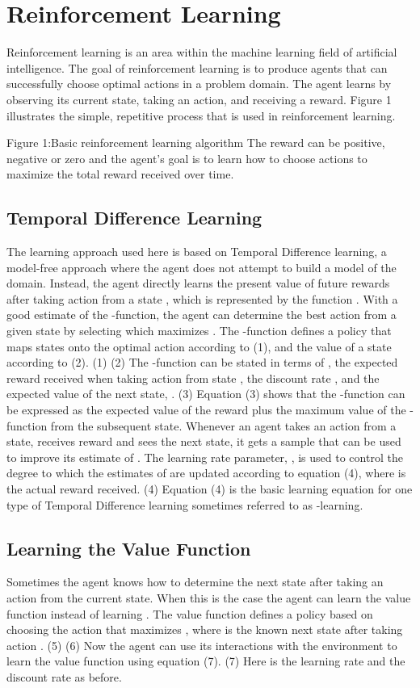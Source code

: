 \section{Reinforcement Learning}

Reinforcement learning is an area within the machine learning field of artificial intelligence.  The goal of reinforcement learning is to produce agents that can successfully choose optimal actions in a problem domain.  The agent learns by observing its current state, taking an action, and receiving a reward.  Figure 1 illustrates the simple, repetitive process that is used in reinforcement learning.

 
Figure 1:Basic reinforcement learning algorithm
The reward can be positive, negative or zero and the agent’s goal is to learn how to choose actions to maximize the total reward received over time.

\subsection{Temporal Difference Learning}
The learning approach used here is based on Temporal Difference learning, a model-free approach where the agent does not attempt to build a model of the domain.  Instead, the agent directly learns the present value of future rewards after taking action   from a state  , which is represented by the function  .  With a good estimate of the  -function, the agent can determine the best action from a given state by selecting   which maximizes  .  The  -function defines a policy   that maps states onto the optimal action according to (1), and the value of a state   according to (2).
	 	(1)
	 	(2)
The  -function can be stated in terms of  , the expected reward received when taking action   from state  , the discount rate  , and the expected value of the next state,  .
	 	(3)
Equation (3) shows that the  -function can be expressed as the expected value of the reward plus the maximum value of the  -function from the subsequent state.  Whenever an agent takes an action from a state, receives reward and sees the next state, it gets a sample that can be used to improve its estimate of  .  The learning rate parameter,  , is used to control the degree to which the estimates of   are updated according to equation (4), where   is the actual reward received.
	 	(4)
Equation (4) is the basic learning equation for one type of Temporal Difference learning sometimes referred to as  -learning.

\subsection{Learning the Value Function}
Sometimes the agent knows how to determine the next state after taking an action from the current state.  When this is the case the agent can learn the value function   instead of learning  .  The value function defines a policy based on choosing the action that maximizes  , where   is the known next state after taking action  .
	 	(5)
	 	(6)
Now the agent can use its interactions with the environment to learn the value function using equation (7).
	 	(7)
Here   is the learning rate and   the discount rate as before.

